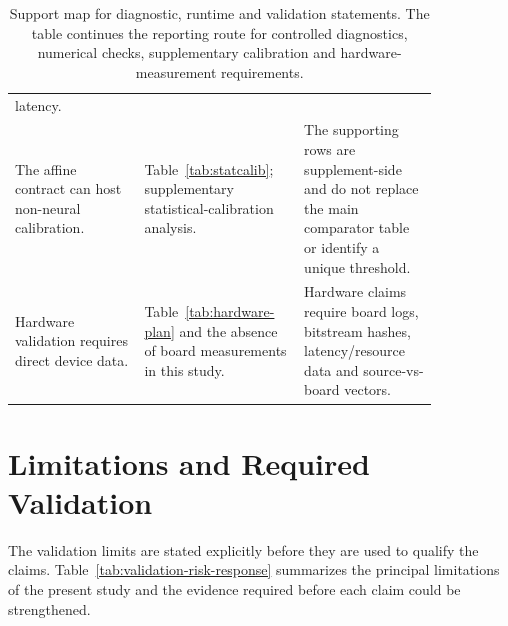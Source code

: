 \documentclass[11pt]{article}
\begin{document}
\begin{table}[htbp]
\begin{tabular}{@{}>{\raggedright\arraybackslash}p{0.27\linewidth}>{\raggedright\arraybackslash}p{0.28\linewidth}>{\raggedright\arraybackslash}p{0.29\linewidth}@{}}
latency. \\
\addlinespace
The affine contract can host non-neural calibration. &
Table~\ref{tab:statcalib}; supplementary statistical-calibration analysis. &
The supporting rows are supplement-side and do not replace the main comparator
table or identify a unique threshold. \\
\addlinespace
Hardware validation requires direct device data. & Table~\ref{tab:hardware-plan}
and the absence of board measurements in this study. & Hardware claims require
board logs, bitstream hashes, latency/resource data and source-vs-board vectors. \\
\bottomrule
\end{tabular}
\caption{Support map for diagnostic, runtime and validation statements.
The table continues the reporting route for controlled diagnostics, numerical
checks, supplementary calibration and hardware-measurement requirements.}
\label{tab:claim-support-diagnostics}
\end{table}

\section{Limitations and Required Validation}

The validation limits are stated explicitly before they are used to qualify the
claims.  Table~\ref{tab:validation-risk-response} summarizes the principal
limitations of the present study and the evidence required before each claim
could be strengthened.
\end{document}
